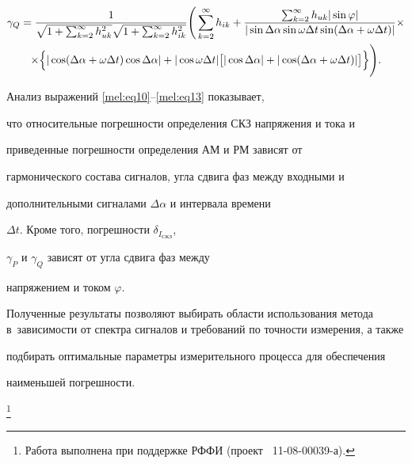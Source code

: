 \vspace{-5mm}



\begin{multline}

\gamma _Q =\frac{1}{\sqrt {1+\sum_{k=2}^\infty

h_{uk}^2 } \sqrt {1+\sum_{k=2}^\infty h_{ik}^2 }

}\Bigg ( \sum\limits_{k=2}^\infty h_{ik} + \frac{\sum_{k=2}^\infty h_{uk} |\sin

\varphi|}{|\sin \Delta \alpha \sin \omega \Delta

t\sin (\Delta \alpha +\omega \Delta t)

|} \times \\ \times  \Bigl\{ |\cos (\Delta \alpha +\omega \Delta t)\cos \Delta

\alpha|+|\cos \omega \Delta t|  \bigl[|\cos \Delta \alpha|+|\cos (\Delta

\alpha +\omega \Delta t)|\bigr] \Bigr\}\Bigg).

 \label{mel:eq13}

\end{multline}



Анализ выражений \eqref{mel:eq10}--\eqref{mel:eq13} показывает,

что относительные погрешности определения СКЗ напряжения и тока и

приведенные погрешности определения АМ и РМ зависят от

гармонического состава сигналов, угла сдвига фаз между входными и

дополнительными сигналами $\Delta \alpha $ и интервала времени

$\Delta t$. Кроме того, погрешности $\delta _{I_{\text{СКЗ}}}$,

$\gamma _P $ и $\gamma _Q $ зависят от угла сдвига фаз между

напряжением и током $\varphi$.



Полученные результаты позволяют выбирать области использования метода в~зависимости от спектра сигналов и требований по точности измерения, а также

подбирать оптимальные параметры измерительного процесса для обеспечения

наименьшей погрешности.



\thanks{Работа выполнена при поддержке РФФИ (проект \No~11-08-00039-а).}



